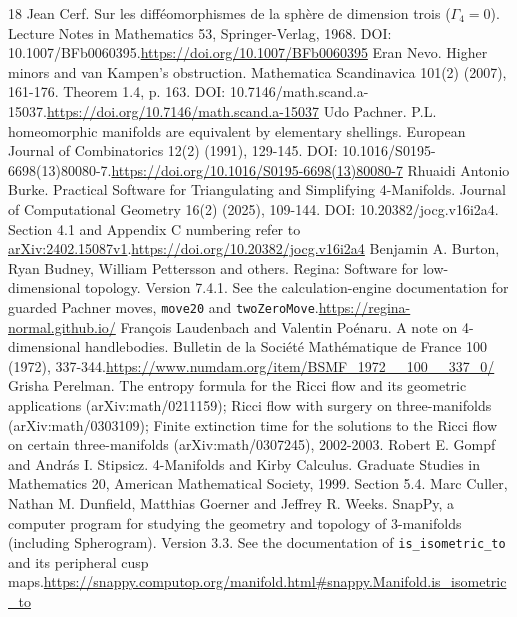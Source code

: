 \documentclass[11pt,letterpaper]{article}
\begin{document}
\begin{thebibliography}{18}
 Jean Cerf. Sur les difféomorphismes de la sphère de dimension trois ($\Gamma_4=0$). Lecture Notes in Mathematics 53, Springer-Verlag, 1968. DOI: 10.1007/BFb0060395.\newline\url{https://doi.org/10.1007/BFb0060395}
 Eran Nevo. Higher minors and van Kampen's obstruction. Mathematica Scandinavica 101(2) (2007), 161-176. Theorem 1.4, p. 163. DOI: 10.7146/math.scand.a-15037.\newline\url{https://doi.org/10.7146/math.scand.a-15037}
 Udo Pachner. P.L. homeomorphic manifolds are equivalent by elementary shellings. European Journal of Combinatorics 12(2) (1991), 129-145. DOI: 10.1016/S0195-6698(13)80080-7.\newline\url{https://doi.org/10.1016/S0195-6698(13)80080-7}
 Rhuaidi Antonio Burke. Practical Software for Triangulating and Simplifying 4-Manifolds. Journal of Computational Geometry 16(2) (2025), 109-144. DOI: 10.20382/jocg.v16i2a4. Section 4.1 and Appendix C numbering refer to \href{https://arxiv.org/abs/2402.15087v1}{arXiv:2402.15087v1}.\newline\url{https://doi.org/10.20382/jocg.v16i2a4}
 Benjamin A. Burton, Ryan Budney, William Pettersson and others. Regina: Software for low-dimensional topology. Version 7.4.1. See the calculation-engine documentation for guarded Pachner moves, \texttt{move20} and \texttt{twoZeroMove}.\newline\url{https://regina-normal.github.io/}
 François Laudenbach and Valentin Poénaru. A note on 4-dimensional handlebodies. Bulletin de la Société Mathématique de France 100 (1972), 337-344.\newline\url{https://www.numdam.org/item/BSMF_1972__100__337_0/}
 Grisha Perelman. The entropy formula for the Ricci flow and its geometric applications (arXiv:math/0211159); Ricci flow with surgery on three-manifolds (arXiv:math/0303109); Finite extinction time for the solutions to the Ricci flow on certain three-manifolds (arXiv:math/0307245), 2002-2003.
 Robert E. Gompf and András I. Stipsicz. 4-Manifolds and Kirby Calculus. Graduate Studies in Mathematics 20, American Mathematical Society, 1999. Section 5.4.
 Marc Culler, Nathan M. Dunfield, Matthias Goerner and Jeffrey R. Weeks. SnapPy, a computer program for studying the geometry and topology of 3-manifolds (including Spherogram). Version 3.3. See the documentation of \texttt{is\_isometric\_to} and its peripheral cusp maps.\newline\url{https://snappy.computop.org/manifold.html#snappy.Manifold.is_isometric_to}
\end{thebibliography}
\end{document}

